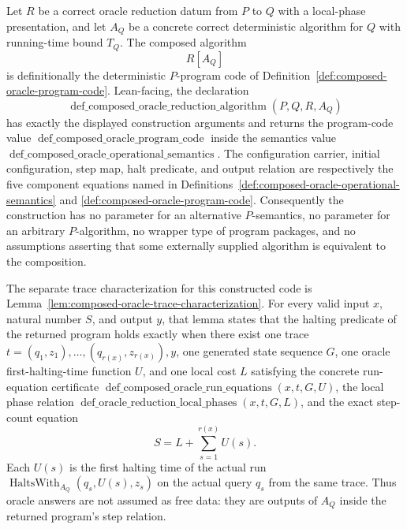 \begin{definition}
  \label{def:composed-oracle-reduction-algorithm}
  Let $R$ be a correct oracle reduction datum from $P$ to $Q$ with a local-phase
  presentation, and let $A_Q$ be a concrete correct deterministic algorithm for
  $Q$ with running-time bound $T_Q$.  The composed algorithm
  \[
    R[A_Q]
  \]
  is definitionally the deterministic $P$-program code of
  Definition~\ref{def:composed-oracle-program-code}.  Lean-facing, the
  declaration
  \[
    \operatorname{def\_composed\_oracle\_reduction\_algorithm}(P,Q,R,A_Q)
  \]
  has exactly the displayed construction arguments and returns the program-code
  value $\operatorname{def\_composed\_oracle\_program\_code}$ inside the
  semantics value
  $\operatorname{def\_composed\_oracle\_operational\_semantics}$.  The
  configuration carrier, initial configuration, step map, halt predicate, and
  output relation are respectively the five component equations named in
  Definitions~\ref{def:composed-oracle-operational-semantics} and
  \ref{def:composed-oracle-program-code}.  Consequently the construction has
  no parameter for an alternative $P$-semantics, no parameter for an arbitrary
  $P$-algorithm, no wrapper type of program packages, and no assumptions
  asserting that some externally supplied algorithm is equivalent to the
  composition.

  The separate trace characterization for this constructed code is
  Lemma~\ref{lem:composed-oracle-trace-characterization}.  For every valid
  input $x$, natural number $S$, and output $y$, that lemma states that the
  halting predicate of the returned program holds exactly when there exist one
  trace
  $t=(q_1,z_1),\ldots,(q_{r(x)},z_{r(x)}),y$, one generated state sequence $G$,
  one oracle first-halting-time function $U$, and one local cost $L$ satisfying
  the concrete run-equation certificate
  $\operatorname{def\_composed\_oracle\_run\_equations}(x,t,G,U)$, the local
  phase relation
  $\operatorname{def\_oracle\_reduction\_local\_phases}(x,t,G,L)$, and the
  exact step-count equation
  \[
    S=L+\sum_{s=1}^{r(x)}U(s).
  \]
  Each $U(s)$ is the first halting time of the actual run
  $\operatorname{HaltsWith}_{A_Q}(q_s,U(s),z_s)$ on the actual query $q_s$ from
  the same trace.  Thus oracle answers are not assumed as free data: they are
  outputs of $A_Q$ inside the returned program's step relation.


\end{definition}
